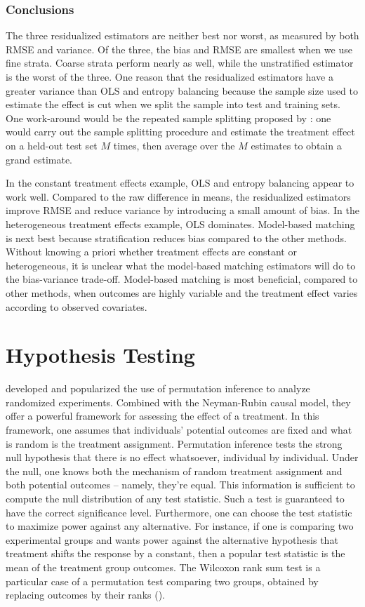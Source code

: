\documentclass[12pt]{article}
\begin{document}
\subsubsection{Conclusions}

The three residualized estimators are neither best nor worst, as measured by both RMSE and variance.
Of the three, the bias and RMSE are smallest when we use fine strata.
Coarse strata perform nearly as well, while the unstratified estimator is the worst of the three.
One reason that the residualized estimators have a greater variance than OLS and entropy balancing because the sample size used to estimate the effect is cut when we split the sample into test and training sets.
One work-around would be the repeated sample splitting proposed by \cite{abadie_endogenous_2013}: one would carry out the sample splitting procedure and estimate the treatment effect on a held-out test set $M$ times, then average over the $M$ estimates to obtain a grand estimate.

In the constant treatment effects example, OLS and entropy balancing appear to work well.
Compared to the raw difference in means, the residualized estimators improve RMSE and reduce variance by introducing a small amount of bias.
In the heterogeneous treatment effects example, OLS dominates. 
Model-based matching is next best because stratification reduces bias compared to the other methods.
Without knowing a priori whether treatment effects are constant or heterogeneous, it is unclear what the model-based matching estimators will do to the bias-variance trade-off.
Model-based matching is most beneficial, compared to other methods, when outcomes are highly variable and the treatment effect varies according to observed covariates.  

\section{Hypothesis Testing}
\citet{fisher_design_1935} developed and popularized the use of permutation inference to analyze randomized experiments.
Combined with the Neyman-Rubin causal model, they offer a powerful framework for assessing the effect of a treatment.
In this framework, one assumes that individuals' potential outcomes are fixed and what is random is the treatment assignment.
Permutation inference tests the strong null hypothesis that there is no effect whatsoever, individual by individual.
Under the null, one knows both the mechanism of random treatment assignment and both potential outcomes -- namely, they're equal.
This information is sufficient to compute the null distribution of any test statistic.
Such a test is guaranteed to have the correct significance level.
Furthermore, one can choose the test statistic to maximize power against any alternative.
For instance, if one is comparing two experimental groups and wants power against the alternative hypothesis that treatment shifts the response by a constant, 
then a popular test statistic is the mean of the treatment group outcomes.
The Wilcoxon rank sum test is a particular case of a permutation test comparing two groups, obtained by replacing outcomes by their ranks (\cite{wilcoxon_individual_1945}).
\end{document}
